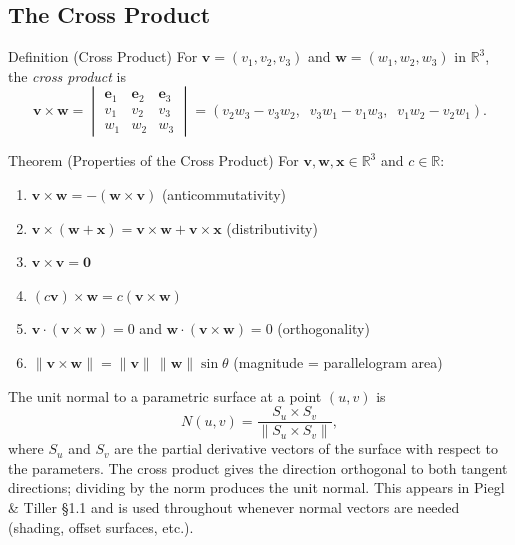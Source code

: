 \subsection*{The Cross Product}

\begin{propositionbox}{Definition (Cross Product)}
For $\mathbf{v} = (v_1, v_2, v_3)$ and $\mathbf{w} = (w_1, w_2, w_3)$ in $\mathbb{R}^3$,
the \emph{cross product} is
\[
  \mathbf{v} \times \mathbf{w}
  = \begin{vmatrix} \mathbf{e}_1 & \mathbf{e}_2 & \mathbf{e}_3 \\
                    v_1 & v_2 & v_3 \\
                    w_1 & w_2 & w_3
    \end{vmatrix}
  = (v_2 w_3 - v_3 w_2,\;\; v_3 w_1 - v_1 w_3,\;\; v_1 w_2 - v_2 w_1).
\]
\end{propositionbox}

\begin{theorembox}{Theorem (Properties of the Cross Product)}
For $\mathbf{v}, \mathbf{w}, \mathbf{x} \in \mathbb{R}^3$ and $c \in \mathbb{R}$:
\begin{enumerate}
  \item $\mathbf{v} \times \mathbf{w} = -(\mathbf{w} \times \mathbf{v})$ \hfill (anticommutativity)
  \item $\mathbf{v} \times (\mathbf{w} + \mathbf{x}) = \mathbf{v} \times \mathbf{w} + \mathbf{v} \times \mathbf{x}$ \hfill (distributivity)
  \item $\mathbf{v} \times \mathbf{v} = \mathbf{0}$
  \item $(c\mathbf{v}) \times \mathbf{w} = c(\mathbf{v} \times \mathbf{w})$
  \item $\mathbf{v} \cdot (\mathbf{v} \times \mathbf{w}) = 0$ and $\mathbf{w} \cdot (\mathbf{v} \times \mathbf{w}) = 0$ \hfill (orthogonality)
  \item $\|\mathbf{v} \times \mathbf{w}\| = \|\mathbf{v}\|\,\|\mathbf{w}\|\sin\theta$ \hfill (magnitude = parallelogram area)
\end{enumerate}
\end{theorembox}

\begin{remark*}
The unit normal to a parametric surface at a point $(u,v)$ is
\[
  N(u,v) = \frac{S_u \times S_v}{\|S_u \times S_v\|},
\]
where $S_u$ and $S_v$ are the partial derivative vectors of the surface
with respect to the parameters.
The cross product gives the direction orthogonal to both tangent directions;
dividing by the norm produces the unit normal.
This appears in Piegl \& Tiller §1.1 and is used throughout whenever
normal vectors are needed (shading, offset surfaces, etc.).
\end{remark*}


